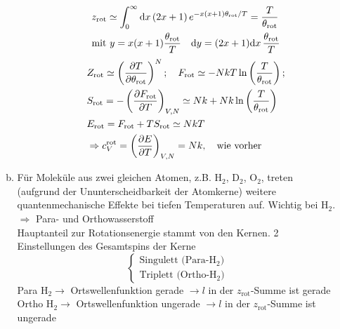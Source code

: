 \begin{enumerate}[A)]
\begin{enumerate}[a)]
\begin{enumerate}[i)]
\begin{equation}
                \begin{split}
                    & z_\text{rot} \simeq \int_{0}^{\infty} \mathrm{d} x \left( 2 x + 1 \right) e^{-x(x+1) \theta_\text{rot} / T} = \frac{T}{\theta_\text{rot}} \\
                    & \text{mit } y = x(x+1) \frac{\theta_\text{rot}}{T} \quad \mathrm{d} y = (2x+1)\mathrm{d} x \, \frac{\theta_\text{rot}}{T}
                \end{split}
            \end{equation}
            \begin{equation}
                \begin{split}
                    & Z_\text{rot} \simeq \left( \frac{\partial T}{\partial \theta_\text{rot}} \right)_{}^N; \quad F_\text{rot} \simeq - N k T \ln \left( \frac{T}{\theta_\text{rot}} \right); \\
                    & S_\text{rot} = - \left( \frac{\partial F_\text{rot}}{\partial T} \right)_{V, N} \simeq N k + Nk \ln \left( \frac{T}{\theta_\text{rot}} \right) \\
                    & E_\text{rot} = F_\text{rot} + T S_\text{rot} \simeq N k T \\
                    & \Rightarrow c_V^\text{rot} = \left( \frac{\partial E}{\partial T} \right)_{V, N} = N k, \quad \text{wie vorher}
                \end{split}
            \end{equation}
        \end{enumerate}
        \item Für Moleküle aus zwei gleichen Atomen, z.B. H$_2$, D$_2$, O$_2$, treten (aufgrund der Ununterscheidbarkeit der Atomkerne) weitere
        quantenmechanische Effekte bei tiefen Temperaturen auf. Wichtig bei H$_2$. \\
        $\Rightarrow$ Para- und Orthowasserstoff \\
        Hauptanteil zur Rotationsenergie stammt von den Kernen. 2 Einstellungen des Gesamtspins der Kerne
        \begin{equation}
            \begin{cases}
                \text{Singulett (Para-H$_2$)} \\
                \text{Triplett (Ortho-H$_2$)}
            \end{cases}
        \end{equation}
        Para H$_2 \rightarrow$ Ortswellenfunktion gerade $\rightarrow l$ in der $z_\text{rot}$-Summe ist gerade \\
        Ortho H$_2 \rightarrow$ Ortswellenfunktion ungerade $\rightarrow l$ in der $z_\text{rot}$-Summe ist ungerade

\end{enumerate}
\end{enumerate}

